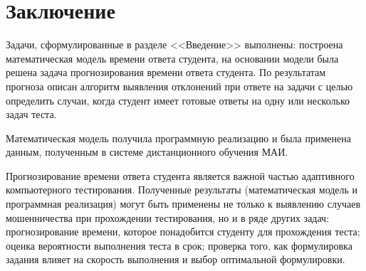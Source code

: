 \chapter{Заключение} 

Задачи, сформулированные в разделе <<Введение>> выполнены: построена математическая модель времени ответа студента, на основании модели была решена задача прогнозирования времени ответа студента. По результатам прогноза описан алгоритм выявления откло\-нений при ответе на задачи с целью определить случаи, когда  студент имеет готовые ответы на одну или несколько задач теста.

Математическая модель получила программную реализацию и была при\-менена данным, полученным в системе дистанционного обучения МАИ.

Прогнозирование времени ответа студента является важной частью адап\-тивного компьютерного тестирования. Полученные результаты (математиче\-ская модель и программная реализация) могут быть применены не только к выявлению случаев мошенничества при прохождении тестирования, но и в ряде других задач: прогнозирование времени, которое понадобится студенту для прохождения теста; оценка вероятности выполнения теста в срок; про\-верка того, как формулировка задания влияет на скорость выполнения и выбор оптимальной формулировки.